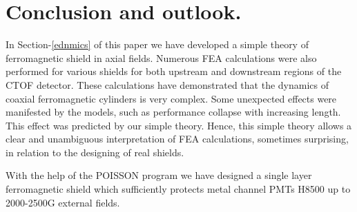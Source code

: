 \documentclass[12pt]{article}
\begin{document}
%
%
%
%
\section{Conclusion and outlook.}
In Section-\ref{ednmics} of this paper we have developed a 
simple theory of ferromagnetic  shield in axial fields.
Numerous FEA calculations were also  performed for various shields for both upstream and 
downstream regions of the CTOF detector. These calculations 
have demonstrated that the dynamics of coaxial   ferromagnetic cylinders is very
complex. Some  unexpected effects were manifested by the models, such as  performance  
collapse with increasing  length.  This effect was predicted  by our simple   theory.
Hence, this  simple theory allows a  clear and unambiguous   interpretation of  
FEA calculations, sometimes surprising, in relation to the  designing of real shields.

With the  help of the POISSON program we have designed a  single layer  ferromagnetic 
shield which  sufficiently protects  metal channel PMTs H8500 up to 2000-2500G 
external fields.   
                                                        
\end{document}
